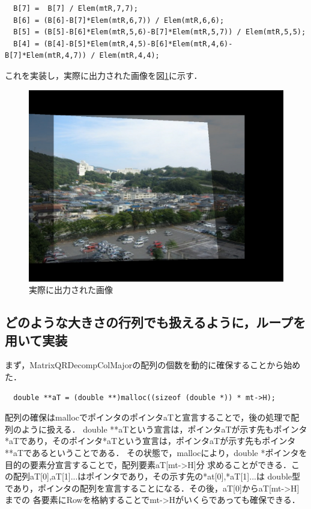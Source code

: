 \documentclass[11pt]{jarticle}
\begin{document}
\begin{verbatim}
  B[7] =  B[7] / Elem(mtR,7,7);
  B[6] = (B[6]-B[7]*Elem(mtR,6,7)) / Elem(mtR,6,6);
  B[5] = (B[5]-B[6]*Elem(mtR,5,6)-B[7]*Elem(mtR,5,7)) / Elem(mtR,5,5);
  B[4] = (B[4]-B[5]*Elem(mtR,4,5)-B[6]*Elem(mtR,4,6)-B[7]*Elem(mtR,4,7)) / Elem(mtR,4,4);
\end{verbatim}

これを実装し，実際に出力された画像を図\ref{3-1.jpg}に示す．

\begin{figure}[ht]
  \centering
  \includegraphics[scale=.2]{3-1.jpg}
  \caption{実際に出力された画像}
  \label{3-1.jpg}
\end{figure}

\subsection{どのような大きさの行列でも扱えるように，ループを用いて実装}

まず，MatrixQRDecompColMajorの配列の個数を動的に確保することから始めた．
\begin{verbatim}
  double **aT = (double **)malloc((sizeof (double *)) * mt->H);
\end{verbatim}
配列の確保はmallocでポインタのポインタaTと宣言することで，後の処理で配列のように扱える．
double **aTという宣言は，ポインタaTが示す先もポインタ*aTであり，そのポインタ*aTという宣言は，ポインタaTが示す先もポインタ
**aTであるということである．
その状態で，mallocにより，double *ポインタを目的の要素分宣言することで，配列要素aT[mt->H]分
求めることができる．この配列aT[0],aT[1]...はポインタであり，その示す先の*at[0],*aT[1]...は
double型であり，ポインタの配列を宣言することになる．その後，aT[0]からaT[mt->H]までの
各要素にRowを格納することでmt->Hがいくらであっても確保できる．
\end{document}
